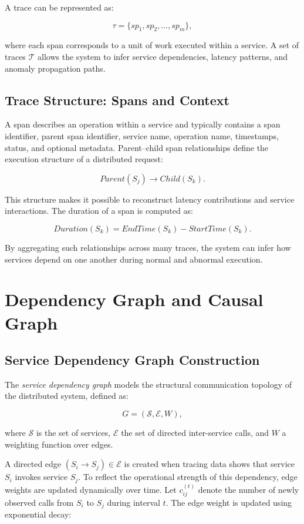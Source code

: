 A trace can be represented as:

\[
\tau = \{sp_1, sp_2, \dots, sp_m\},
\]

where each span corresponds to a unit of work executed within a service. A set of 
traces $\mathcal{T}$ allows the system to infer service dependencies, latency 
patterns, and anomaly propagation paths.

\subsection{Trace Structure: Spans and Context}
\label{subsec:rca_trace_structure}

A span describes an operation within a service and typically contains a span 
identifier, parent span identifier, service name, operation name, timestamps, 
status, and optional metadata. Parent--child span relationships define the 
execution structure of a distributed request:

\[
Parent(S_j) \to Child(S_k).
\]

This structure makes it possible to reconstruct latency contributions and service 
interactions. The duration of a span is computed as:

\[
Duration(S_k) = EndTime(S_k) - StartTime(S_k).
\]

By aggregating such relationships across many traces, the system can infer how 
services depend on one another during normal and abnormal execution.

\section{Dependency Graph and Causal Graph}
\label{sec:rca_graphs}

\subsection{Service Dependency Graph Construction}
\label{subsec:rca_dependency_graph}

The \emph{service dependency graph} models the structural communication topology 
of the distributed system, defined as:

\[
G = (\mathcal{S}, \mathcal{E}, W),
\]

where $\mathcal{S}$ is the set of services, $\mathcal{E}$ the set of directed 
inter-service calls, and $W$ a weighting function over edges.

A directed edge $(S_i \to S_j) \in \mathcal{E}$ is created when tracing data 
shows that service $S_i$ invokes service $S_j$. To reflect the operational 
strength of this dependency, edge weights are updated dynamically over time. Let 
$c_{ij}^{(t)}$ denote the number of newly observed calls from $S_i$ to $S_j$ 
during interval $t$. The edge weight is updated using exponential decay:

